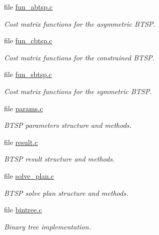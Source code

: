 \begin{CompactItemize}
\item 
file \hyperlink{fun__abtsp_8c}{fun\_\-abtsp.c}
\begin{CompactList}\small\item\em Cost matrix functions for the asymmetric BTSP. \item\end{CompactList}

\item 
file \hyperlink{fun__cbtsp_8c}{fun\_\-cbtsp.c}
\begin{CompactList}\small\item\em Cost matrix functions for the constrained BTSP. \item\end{CompactList}

\item 
file \hyperlink{fun__sbtsp_8c}{fun\_\-sbtsp.c}
\begin{CompactList}\small\item\em Cost matrix functions for the symmetric BTSP. \item\end{CompactList}

\item 
file \hyperlink{params_8c}{params.c}
\begin{CompactList}\small\item\em BTSP parameters structure and methods. \item\end{CompactList}

\item 
file \hyperlink{btsp_2result_8c}{result.c}
\begin{CompactList}\small\item\em BTSP result structure and methods. \item\end{CompactList}

\item 
file \hyperlink{solve__plan_8c}{solve\_\-plan.c}
\begin{CompactList}\small\item\em BTSP solve plan structure and methods. \item\end{CompactList}

\item 
file \hyperlink{bintree_8c}{bintree.c}
\begin{CompactList}\small\item\em Binary tree implementation. \item\end{CompactList}


\end{CompactItemize}
